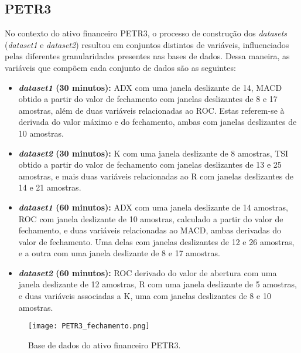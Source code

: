 \subsection{PETR3}
No contexto do ativo financeiro PETR3, o processo de construção dos \textit{datasets} (\textit{dataset1} e \textit{dataset2}) resultou em conjuntos distintos de variáveis, influenciados pelas diferentes granularidades presentes nas bases de dados. Dessa maneira, as variáveis que compõem cada conjunto de dados são as seguintes:
\begin{itemize}
	\item \textbf{\textit{dataset1} (30 minutos):} \ac{ADX} com uma janela deslizante de 14, \ac{MACD} obtido a partir do valor de fechamento com janelas deslizantes de 8 e 17 amostras, além de duas variáveis relacionadas ao \ac{ROC}. Estas referem-se à derivada do valor máximo e do fechamento, ambas com janelas deslizantes de 10 amostras.
	
	\item \textbf{\textit{dataset2} (30 minutos):} \ac{K} com uma janela deslizante de 8 amostras, \ac{TSI} obtido a partir do valor de fechamento com janelas deslizantes de 13 e 25 amostras, e mais duas variáveis relacionadas ao \ac{R} com janelas deslizantes de 14 e 21 amostras.
	
	\item \textbf{\textit{dataset1} (60 minutos):} \ac{ADX} com uma janela deslizante de 14 amostras, \ac{ROC} com janela deslizante de 10 amostras, calculado a partir do valor de fechamento, e duas variáveis relacionadas ao \ac{MACD}, ambas derivadas do valor de fechamento. Uma delas com janelas deslizantes de 12 e 26 amostras, e a outra com uma janela deslizante de 8 e 17 amostras.
	
	\item \textbf{\textit{dataset2} (60 minutos):} \ac{ROC} derivado do valor de abertura com uma janela deslizante de 12 amostras, \ac{R} com uma janela deslizante de 5 amostras, e duas variáveis associadas a \ac{K}, uma com janelas deslizantes de 8 e 10 amostras.
\end{itemize}

\begin{figure}[htbp]
	\caption{Base de dados do ativo financeiro PETR3.}
	\centering
	\texttt{[image: PETR3\_fechamento.png]} 
	\label{fig:PETR3_fechamento}
\end{figure}

